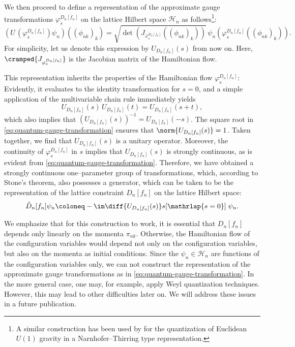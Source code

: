 We then proceed to define a representation of the approximate gauge transformations $\varphi_s^{D_n[f_n]}$ on the lattice Hilbert space $\mathcal H_n$ as follows\footnote{A similar construction has been used by \textcite{Thiemann-U1} for the quantization of Euclidean $U(1)$ gravity in a Narnhofer--Thirring type representation.}:
\begin{equation}
    \left(U\,\left(\varphi_s^{D_n[f_n]}\right)\psi_n\right)((\phi_{nk})_k) = \sqrt{\det\left(J_{\varphi_s^{D_n[f_n]}}((\phi_{nk})_k)\right)}\,\psi_n(\varphi_s^{D_n[f_n]}((\phi_{nk})_k)). \label{eq:quantum-gauge-transformation}
\end{equation}
For simplicity, let us denote this expression by $U_{D_n[f_n]}(s)$ from now on.
Here, $\cramped{J_{\varphi_s^{D_n[f_n]}}}$ is the Jacobian matrix of the Hamiltonian flow.

This representation inherits the properties of the Hamiltonian flow $\varphi_s^{D_n[f_n]}$:
Evidently, it evaluates to the identity transformation for $s=0$, and a simple application of the multivariable chain rule immediately yields
\begin{equation}
    U_{D_n[f_n]}(s)\,U_{D_n[f_n]}(t)=U_{D_n[f_n]}(s+t) ,
\end{equation}
which also implies that $(U_{D_n[f_n]}(s))^{-1} = U_{D_n[f_n]}(-s)$.
The square root in \cref{eq:quantum-gauge-transformation} ensures that $\norm{U_{D_n[f_n]}(s)} = 1$.
Taken together, we find that $U_{D_n[f_n]}(s)$ is a unitary operator.
Moreover, the continuity of $\varphi_s^{D_n[f_n]}$ in $s$ implies that $U_{D_n[f_n]}(s)$ is strongly continuous, as is evident from \cref{eq:quantum-gauge-transformation}.
Therefore, we have obtained a strongly continuous one--parameter group of transformations, which, according to Stone's theorem, also possesses a generator, which can be taken to be the representation of the lattice constraint $D_n[f_n]$ on the lattice Hilbert space:
\begin{equation}
    \hat D_n[f_n] \psi_n \coloneq -\im\diff{U_{D_n[f_n]}(s)}s[\mathrlap{s=0}]\; \psi_n .
\end{equation}

We emphasize that for this construction to work, it is essential that $D_n[f_n]$ depends only linearly on the momenta $\pi_{nk}$.
Otherwise, the Hamiltonian flow of the configuration variables would depend not only on the configuration variables, but also on the momenta as initial conditions.
Since the $\psi_n\in\mathcal H_n$ are functions of the configuration variables only, we can not construct the representation of the approximate gauge transformations as in \cref{eq:quantum-gauge-transformation}.
In the more general case, one may, for example, apply Weyl quantization techniques.
However, this may lead to other difficulties later on.
We will address these issues in a future publication.

